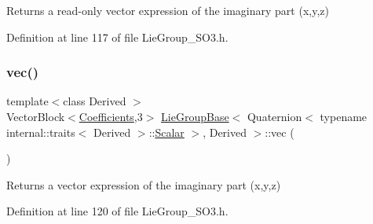 \begin{DoxyReturn}{Returns}
a read-\/only vector expression of the imaginary part (x,y,z) 
\end{DoxyReturn}


Definition at line 117 of file Lie\+Group\+\_\+\+S\+O3.\+h.

\hypertarget{class_lie_group_base_3_01_quaternion_3_01typename_01internal_1_1traits_3_01_derived_01_4_1_1_scalar_01_4_00_01_derived_01_4_aaf1214ad6460ba86c5f7d3c00f6d21d7}{}\label{class_lie_group_base_3_01_quaternion_3_01typename_01internal_1_1traits_3_01_derived_01_4_1_1_scalar_01_4_00_01_derived_01_4_aaf1214ad6460ba86c5f7d3c00f6d21d7} 
\subsubsection{\texorpdfstring{vec()}{vec()}\hspace{0.1cm}{\footnotesize\ttfamily [2/2]}}
{\footnotesize\ttfamily template$<$class Derived $>$ \\
Vector\+Block$<$\hyperlink{class_lie_group_base_3_01_quaternion_3_01typename_01internal_1_1traits_3_01_derived_01_4_1_1_scalar_01_4_00_01_derived_01_4_a05070964df6c909014295fe81ea2ac44}{Coefficients},3$>$ \hyperlink{class_lie_group_base}{Lie\+Group\+Base}$<$ Quaternion$<$ typename internal\+::traits$<$ Derived $>$\+::\hyperlink{class_lie_group_base_3_01_quaternion_3_01typename_01internal_1_1traits_3_01_derived_01_4_1_1_scalar_01_4_00_01_derived_01_4_afadeceb3b98e52deecc572e71efb82a8}{Scalar} $>$, Derived $>$\+::vec (\begin{DoxyParamCaption}{ }\end{DoxyParamCaption})\hspace{0.3cm}{\ttfamily [inline]}}

\begin{DoxyReturn}{Returns}
a vector expression of the imaginary part (x,y,z) 
\end{DoxyReturn}


Definition at line 120 of file Lie\+Group\+\_\+\+S\+O3.\+h.

